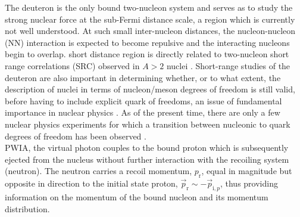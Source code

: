 The deuteron is the only bound two-nucleon system and serves as \DIFdelbegin {}\DIFdelend \DIFaddbegin {}\DIFaddend to study the strong nuclear force at the sub-Fermi distance scale, a region which is currently
\DIFaddbegin {}\DIFaddend not well understood. At such small inter-nucleon distances, the nucleon-nucleon (NN) interaction is expected to become repulsive and the interacting
nucleons begin to overlap. \DIFdelbegin {}\DIFdelend \DIFaddbegin {}\DIFaddend short distance region is directly related to \DIFaddbegin {}\DIFaddend two-nucleon short range correlations (SRC) observed in $A>2$ nuclei \cite{PhysRevC.68.014313,PhysRevLett.96.082501,PhysRevLett.99.072501,Fomin_2017,Barack_2019,RevModPhys.89.045002}.
Short-range studies of the deuteron are also important in determining whether, or to what extent, the description of nuclei in terms of nucleon/meson degrees of freedom is still valid, before
having to include explicit quark \DIFdelbegin {}\DIFdelend \DIFaddbegin {}\DIFaddend of freedoms, an issue of fundamental importance in nuclear physics \cite{sargsian_2015}. As of the present time, there are only a few nuclear physics experiments for
which a transition between nucleonic to quark degrees of freedom has been observed \cite{PhysRevLett.81.4576,PhysRevLett.87.102302,PhysRevC.66.042201}. \\
\indent \DIFdelbegin {}\DIFdelend \DIFaddbegin {}\DIFaddend PWIA, the virtual photon couples to
the bound proton which is subsequently ejected from the nucleus without further interaction with the recoiling system (neutron). The neutron carries a recoil momentum, $p_{\mathrm{r}}$, equal in magnitude but opposite in direction
to the initial state proton, $\vec{p}_{\mathrm{r}} \sim -\vec{p}_{\mathrm{i},p}$, thus providing information on the momentum of the bound nucleon and its momentum distribution.\DIFdelbegin {}\DIFdelend \\
